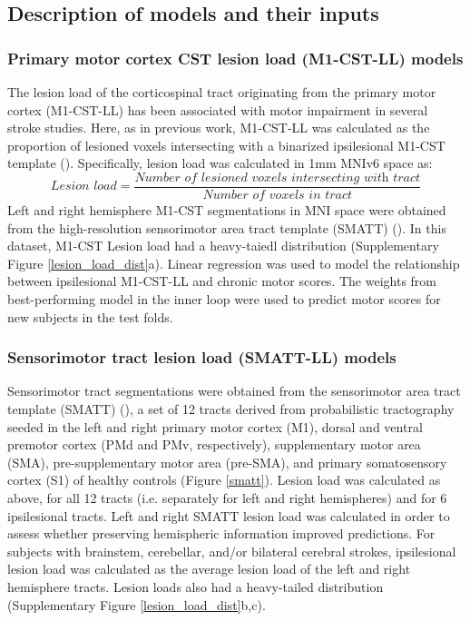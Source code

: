 \documentclass[10pt]{article}
\begin{document}
\subsection{Description of models and their inputs}
\subsubsection*{Primary motor cortex CST lesion load (M1-CST-LL) models}

The lesion load of the corticospinal tract originating from the primary motor cortex (M1-CST-LL) has been associated with motor impairment in several stroke studies. Here, as in previous work, M1-CST-LL was calculated as the proportion of lesioned voxels intersecting with a binarized ipsilesional M1-CST template (\cite{Zhu2010-qh}). Specifically, lesion load was calculated in 1mm MNIv6 space as:
\begin{equation}
    \textit{Lesion load} = \frac{\textit{Number of lesioned voxels intersecting with  tract}}{\textit{Number of voxels in tract}}
\end{equation}
Left and right hemisphere M1-CST segmentations in MNI space were obtained from the high-resolution sensorimotor area tract template (SMATT) (\cite{Archer2018-ti}). In this dataset, M1-CST Lesion load had a heavy-taiedl distribution (Supplementary Figure \ref{lesion_load_dist}a).
Linear regression was used to model the relationship between ipsilesional M1-CST-LL and chronic motor scores. The weights from best-performing model in the inner loop were used to predict motor scores for new subjects in the test folds. 

\subsubsection*{Sensorimotor tract lesion load  (SMATT-LL) models}
Sensorimotor tract segmentations were obtained from the sensorimotor area tract template (SMATT) (\cite{Archer2018-ti}), a set of 12 tracts derived from probabilistic tractography seeded in the left and right primary motor cortex (M1), dorsal and ventral premotor cortex (PMd and PMv, respectively), supplementary motor area (SMA), pre-supplementary motor area (pre-SMA), and primary somatosensory cortex (S1) of healthy controls (Figure \ref{smatt}). Lesion load was calculated as above, for all 12 tracts (i.e. separately for left and right hemispheres) and for 6 ipsilesional tracts. Left and right SMATT lesion load was calculated in order to assess whether preserving hemispheric information improved predictions. For subjects with brainstem, cerebellar, and/or bilateral cerebral strokes, ipsilesional lesion load was calculated as the average lesion load of the left and right hemisphere tracts. Lesion loads also had a heavy-tailed distribution (Supplementary Figure \ref{lesion_load_dist}b,c). 
\end{document}
